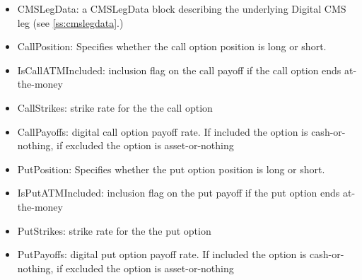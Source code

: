 \begin{itemize}
\item CMSLegData: a CMSLegData block describing the underlying Digital CMS leg (see \ref{ss:cmslegdata}.)
\item CallPosition: Specifies whether the call option position is long or short.
\item IsCallATMIncluded: inclusion flag on the call payoff if the call option ends at-the-money
\item CallStrikes: strike rate for the the call option
\item CallPayoffs: digital call option payoff rate. If included the option is cash-or-nothing, if excluded the option is asset-or-nothing
\item PutPosition: Specifies whether the put option position is long  or short.
\item IsPutATMIncluded: inclusion flag on the put payoff if the put option ends at-the-money
\item PutStrikes: strike rate for the the put option
\item PutPayoffs: digital put option payoff rate. If included the option is cash-or-nothing, if excluded the option is asset-or-nothing
\end{itemize}
